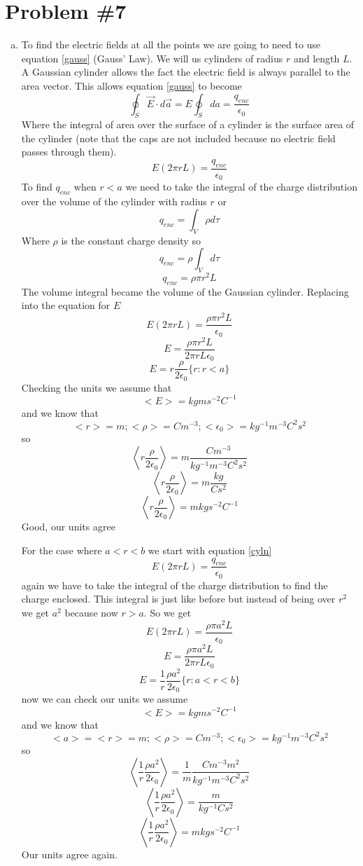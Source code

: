 \documentclass[11pt]{article}
\numberwithin{equation}{section}
\begin{document}
\section{Problem \#7}
\begin{enumerate}[(a)]
\item
To find the electric fields at all the points we are going to need to use equation \ref{gauss} (Gauss' Law). We will us cylinders of radius $r$ and length $L$. A Gaussian cylinder allows the fact the electric field is always parallel to the area vector. This allows equation \ref{gauss} to become
$$\oint_S \vec{E} \cdot d\vec{a} = E\oint_S da = \frac{q_{enc}}{\epsilon_0}$$
Where the integral of area over the surface of a cylinder is the surface area of the cylinder (note that the caps are not included because no electric field passes through them). 
\begin{equation}
E(2\pi r L )= \frac{q_{enc}}{\epsilon_0}
\label{cyln}
\end{equation}
To find $q_{enc}$ when $r<a$ we need to take the integral of the charge distribution over the volume of the cylinder with radius $r$ or
$$q_{enc} = \int_V \rho d\tau$$
Where $\rho$ is the constant charge density so
$$q_{enc} = \rho \int_V d\tau$$
$$q_{enc} = \rho \pi r^2 L$$
The volume integral became the volume of the Gaussian cylinder. Replacing into the equation for $E$
$$E(2\pi r L )= \frac{\rho \pi r^2 L}{\epsilon_0}$$
$$E = \frac{\rho \pi r^2 L}{2\pi r L\epsilon_0}$$
$$E = r\frac{\rho}{2\epsilon_0} \{r:r<a\}$$
Checking the units we assume that
$$<E> = kg m s^{-2} C^{-1}$$
and we know that
$$<r> = m;<\rho>=C m^{-3};<\epsilon_0>=kg^{-1}m^{-3}C^2s^2$$
so 
$$\left<r\frac{\rho}{2\epsilon_0}\right> = m\frac{C m^{-3}}{kg^{-1}m^{-3}C^2s^2}$$
$$\left<r\frac{\rho}{2\epsilon_0}\right> = m\frac{kg}{Cs^2}$$
$$\left<r\frac{\rho}{2\epsilon_0}\right> = m kg s^{-2} C^{-1}$$
Good, our units agree

For the case where $a<r<b$ we start with equation \ref{cyln}
$$E(2\pi r L )= \frac{q_{enc}}{\epsilon_0}$$
again we have to take the integral of the charge distribution to find the charge enclosed. This integral is just like before but instead of being over $r^2$ we get $a^2$ because now $r>a$. So we get
$$E(2\pi r L) = \frac{\rho \pi a^2 L}{\epsilon_0}$$
$$E = \frac{\rho \pi a^2 L}{2\pi r L\epsilon_0}$$
$$E = \frac{1}{r}\frac{\rho a^2}{2\epsilon_0} \{r:a<r<b\}$$
now we can check our units we assume
$$<E> = kg m s^{-2} C^{-1}$$
and we know that
$$<a>=<r> = m;<\rho>=C m^{-3};<\epsilon_0>=kg^{-1}m^{-3}C^2s^2$$
so 
$$\left<\frac{1}{r}\frac{\rho a^2}{2\epsilon_0}\right> = \frac{1}{m}\frac{C m^{-3} m^2}{kg^{-1}m^{-3}C^2s^2}$$
$$\left<\frac{1}{r}\frac{\rho a^2}{2\epsilon_0}\right> = \frac{m}{kg^{-1}Cs^2}$$
$$\left<\frac{1}{r}\frac{\rho a^2}{2\epsilon_0}\right> = m kg s^{-2} C^{-1}$$
Our units agree again.


\end{enumerate}
\end{document}
